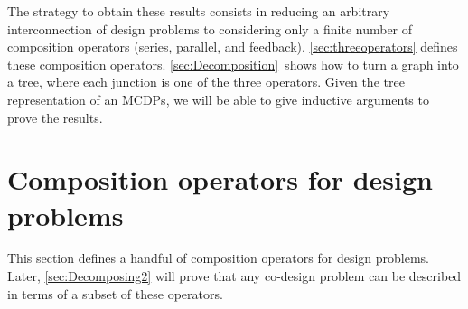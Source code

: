 The strategy to obtain these results consists in reducing an arbitrary
interconnection of design problems to considering\emph{ }only a finite
number of composition operators (series, parallel, and feedback).
\cref{sec:threeoperators} defines these composition operators. \cref{sec:Decomposition}~shows
how to turn a graph into a tree, where each junction is one of the
three operators. Given the tree representation of an MCDPs, we will
be able to give inductive arguments to prove the results.



\section{Composition operators for design problems}

This section defines a handful of composition operators for design
problems. Later, \cref{sec:Decomposing2} will prove that any co-design
problem can be described in terms of a subset of these operators.

